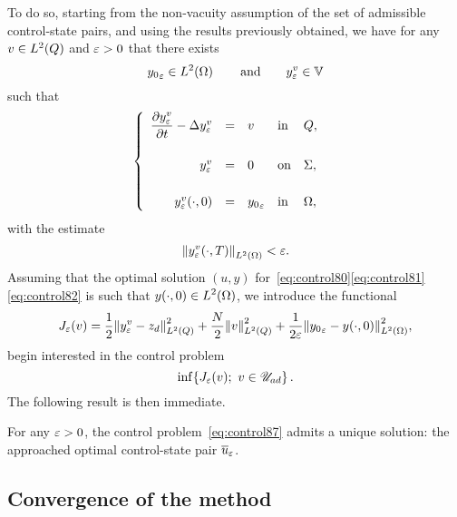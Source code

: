 To do so, starting from the non-vacuity assumption of the set of admissible
control-state pairs, and using the results previously obtained, we have for
any $v\in L^{2}\!\left({Q}\right)$ and $\varepsilon > 0$ that there exists
\begin{equation*}
    {y_{0}}_{\varepsilon}\in L^{2}\!\left({\Omega}\right)\qquad\text{and}\qquad y_{\varepsilon}^{v}\in
    \mathbb{V}
\end{equation*}
such that
\begin{equation*}
    \begin{cases}\displaystyle
        \begin{array}{rclll}
            \dfrac{\partial{}y_{\varepsilon}^{v}}{\partial{}t} - \Delta y_{\varepsilon}^{v} & = & v &
            \text{in} & Q,\\
            \\
            y_{\varepsilon}^{v} & = & 0 & \text{on} & \Sigma,\\
            \\
            {y_{\varepsilon}^{v}}\!\left({\cdot, 0}\right) & = & {y_{0}}_{\varepsilon} &
            \text{in} & \Omega,
        \end{array}
    \end{cases}
\end{equation*}
with the estimate
\begin{equation*}
    \normeohm{%
        \condfinale{y_{\veps}^{v}}
    } < \veps.
\end{equation*}
Assuming that the optimal solution $(u,y)$
for~\eqref{eq:control80}\eqref{eq:control81}\eqref{eq:control82} is such
that $\displaystyle {y}\!\left({\cdot, 0}\right)\in L^{2}\!\left({\Omega}\right)$, we introduce the
functional
\begin{equation*}
    J_{\varepsilon}(v) = \dfrac{1}{2}{\left\|{y_{\varepsilon}^{v} - z_{d} }\right\|}_{L^{2}\left({Q}\right)}^{2} +
    \dfrac{N}{2}{\left\|{v }\right\|}_{L^{2}\left({Q}\right)}^{2} + \dfrac{1}{2\varepsilon}{\left\|{{y_{0}}_{\varepsilon} -
    {y}\!\left({\cdot, 0}\right) }\right\|}_{L^{2}\left({\Omega}\right)}^{2},
\end{equation*}
begin interested in the control problem
\begin{equation}\label{eq:control87}
    \inf\!\left\{{%
        J_{\veps}(v);\ v\in\uad
    }\right\}.
\end{equation}
The following result is then immediate.

\begin{proposition}%
    For any $\varepsilon > 0$, the control problem~\eqref{eq:control87} admits a
    unique solution: the approached optimal control-state pair ${\overline{u}}_{\varepsilon}$.
\end{proposition}

\subsection{Convergence of the method}\label{sec:convergence}

